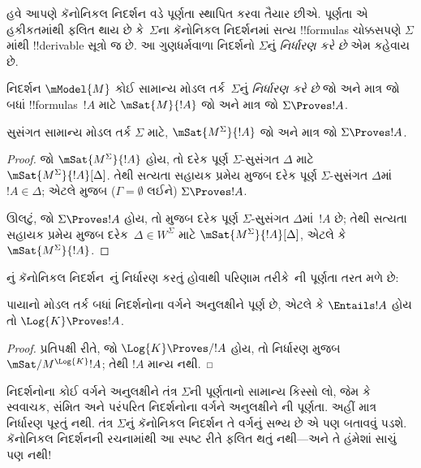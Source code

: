 \documentclass[../../../include/open-logic-section]{subfiles}
\begin{document}


હવે આપણે કૅનોનિકલ નિદર્શન વડે પૂર્ણતા સ્થાપિત કરવા તૈયાર છીએ.
પૂર્ણતા એ હકીકતમાંથી ફલિત થાય છે કે~$\Sigma$ના કૅનોનિકલ નિદર્શનમાં
સત્ય !!{formula}s ચોક્કસપણે $\Sigma$માંથી !!{derivable} સૂત્રો જ છે.
આ ગુણધર્મવાળા નિદર્શનો $\Sigma$નું \emph{નિર્ધારણ કરે છે} એમ કહેવાય છે.

\begin{defn}
  નિદર્શન $\mModel{M}$ કોઈ સામાન્ય મોડલ તર્ક~$\Sigma$નું
  \emph{નિર્ધારણ કરે છે} જો અને માત્ર જો બધાં !!{formula}s~$!A$
  માટે $\mSat{M}{!A}$ જો અને માત્ર જો $\Sigma \Proves !A$.
\end{defn}

\begin{thm}[નિર્ધારણ]
   સુસંગત સામાન્ય મોડલ તર્ક $\Sigma$ માટે,
   $\mSat{M^\Sigma}{!A}$ જો અને માત્ર જો $\Sigma \Proves !A$.
\end{thm}

\begin{proof}
  જો $\mSat{M^\Sigma}{!A}$ હોય, તો દરેક પૂર્ણ
  $\Sigma$-સુસંગત $\Delta$ માટે $\mSat{M^\Sigma}{!A}[\Delta]$.
  તેથી સત્યતા સહાયક પ્રમેય મુજબ દરેક પૂર્ણ $\Sigma$-સુસંગત
  $\Delta$માં $!A \in \Delta$; એટલે
   મુજબ ($\Gamma =
  \emptyset$ લઈને) $\Sigma \Proves !A$.

  ઊલટું, જો $\Sigma \Proves !A$ હોય, તો
  મુજબ દરેક પૂર્ણ $\Sigma$-સુસંગત $\Delta$માં~$!A$ છે; તેથી
  સત્યતા સહાયક પ્રમેય મુજબ દરેક~$\Delta \in W^\Sigma$ માટે
  $\mSat{M^\Sigma}{!A}[\Delta]$, એટલે કે
  $\mSat{M^\Sigma}{!A}$.
\end{proof}


નું કૅનોનિકલ નિદર્શન~નું નિર્ધારણ કરતું હોવાથી
પરિણામ તરીકે~ની પૂર્ણતા તરત મળે છે:

\begin{cor}
  પાયાનો મોડલ તર્ક  બધાં નિદર્શનોના વર્ગને અનુલક્ષીને પૂર્ણ
  છે, એટલે કે $\Entails !A$ હોય તો $\Log{K} \Proves !A$.
\end{cor}

\begin{proof}
  પ્રતિપક્ષી રીતે, જો $\Log{K} \Proves/ !A$ હોય, તો નિર્ધારણ મુજબ
  $\mSat/{M^{\Log{K}}}{!A}$; તેથી $!A$ માન્ય નથી.
\end{proof}

નિદર્શનોના કોઈ વર્ગને અનુલક્ષીને તંત્ર $\Sigma$ની પૂર્ણતાનો સામાન્ય
કિસ્સો લો, જેમ કે સ્વવાચક, સંમિત અને પરંપરિત નિદર્શનોના વર્ગને
અનુલક્ષીને ની પૂર્ણતા. અહીં માત્ર નિર્ધારણ પૂરતું નથી.
તંત્ર $\Sigma$નું કૅનોનિકલ નિદર્શન તે વર્ગનું સભ્ય છે એ પણ બતાવવું
પડશે. કૅનોનિકલ નિદર્શનની રચનામાંથી આ સ્પષ્ટ રીતે ફલિત થતું નથી—અને
તે હંમેશાં સાચું પણ નથી!
\end{document}
